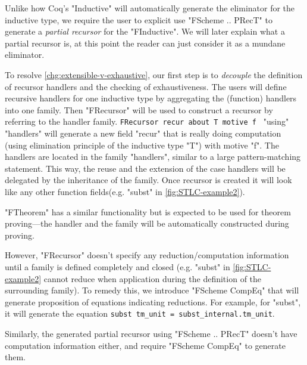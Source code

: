 Unlike how Coq's "Inductive" will automatically generate the eliminator for the inductive type, we require the user to explicit use "FScheme .. PRecT" to generate a \textit{partial recursor} for the "FInductive". We will later explain what a partial recursor is, at this point the reader can just consider it as a mundane eliminator. 


To resolve \ref{chg:extensible-v-exhaustive}, our first step is to
\textit{decouple} the definition of recursor handlers and the checking
of exhaustiveness. The users will define recursive handlers for one
inductive type by aggregating the (function) handlers into one family.
Then
"FRecursor" will be used to construct a recursor by referring to the handler family.
\texttt{FRecursor recur about T motive f } "using"
"handlers" will generate a new field "recur" that is really doing computation
(using elimination principle of the inductive type "T") with motive "f". The handlers
are located in the family "handlers", similar to a large pattern-matching statement. This way, the reuse and the extension of the case handlers will be delegated by the inheritance of the family. Once recursor is created it will look like any other function fields(e.g. "subst" in \cref{fig:STLC-example2}).




"FTheorem" has a similar functionality but is expected to be used for
theorem proving---the handler and the family will be automatically
constructed during proving.

However, "FRecursor" doesn't specify any reduction/computation information until a family is defined completely and closed (e.g. "subst" in \cref{fig:STLC-example2} cannot reduce when application during the definition of the surrounding family). To remedy this, we introduce "FScheme CompEq" that will generate proposition of equations indicating reductions. For example, for "subst", it will generate the equation
\texttt{subst tm_unit = subst_internal.tm_unit}. 

Similarly, the generated partial recursor using "FScheme .. PRecT" doesn't have computation information either, and require "FScheme CompEq" to generate them.

 


